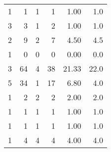 \begin{tabular}{rrrrrr}
         1 &           1 &    1 &    1 &   1.00 &      1.0 \\
         3 &           3 &    1 &    2 &   1.00 &      1.0 \\
         2 &           9 &    2 &    7 &   4.50 &      4.5 \\
         1 &           0 &    0 &    0 &   0.00 &      0.0 \\
         3 &          64 &    4 &   38 &  21.33 &     22.0 \\
         5 &          34 &    1 &   17 &   6.80 &      4.0 \\
         1 &           2 &    2 &    2 &   2.00 &      2.0 \\
         1 &           1 &    1 &    1 &   1.00 &      1.0 \\
         1 &           1 &    1 &    1 &   1.00 &      1.0 \\
         1 &           4 &    4 &    4 &   4.00 &      4.0 \\
\bottomrule
\end{tabular}
